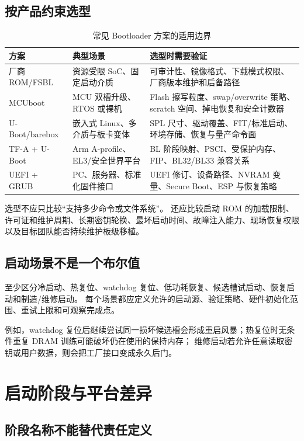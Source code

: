 \subsection{按产品约束选型}

\begin{table}[H]
  \centering
  \caption{常见 Bootloader 方案的适用边界}
  \begin{tabular}{p{28mm}p{43mm}p{66mm}}
    \hline
    方案 & 典型场景 & 选型时需要验证 \\
    \hline
    厂商 ROM/FSBL & 资源受限 SoC、固定启动介质 & 可审计性、镜像格式、下载模式权限、厂商版本维护和后备路径 \\
    MCUboot & MCU 双槽升级、RTOS 或裸机 & Flash 擦写粒度、swap/overwrite 策略、scratch 空间、掉电恢复和安全计数器 \\
    U-Boot/barebox & 嵌入式 Linux、多介质与板卡变体 & SPL 尺寸、驱动覆盖、FIT/标准启动、环境存储、恢复与量产命令面 \\
    TF-A + U-Boot & Arm A-profile、EL3/安全世界平台 & BL 阶段映射、PSCI、受保护内存、FIP、BL32/BL33 兼容关系 \\
    UEFI + GRUB & PC、服务器、标准化固件接口 & UEFI 修订、设备路径、NVRAM 变量、Secure Boot、ESP 与恢复策略 \\
    \hline
  \end{tabular}
\end{table}

选型不应只比较“支持多少命令或文件系统”。
还应比较启动 ROM 的加载限制、许可证和维护周期、长期密钥轮换、最坏启动时间、故障注入能力、现场恢复权限以及目标团队能否持续维护板级移植。

\subsection{启动场景不是一个布尔值}

至少区分冷启动、热复位、watchdog 复位、低功耗恢复、候选槽试启动、恢复启动和制造/维修启动。
每个场景都应定义允许的启动源、验证策略、硬件初始化范围、重试上限和可观察完成点。

例如，watchdog 复位后继续尝试同一损坏候选槽会形成重启风暴；热复位时无条件重复 DRAM 训练可能破坏仍在使用的保持内存；
维修启动若允许任意读取密钥或用户数据，则会把工厂接口变成永久后门。

\section{启动阶段与平台差异}

\subsection{阶段名称不能替代责任定义}

